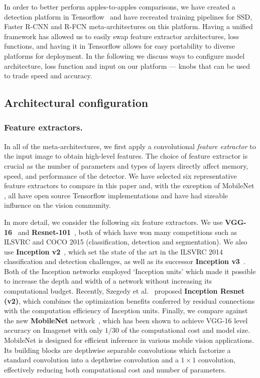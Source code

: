 \documentclass[10pt,twocolumn,letterpaper]{article}
\renewcommand{\paragraph}[1]{\subsubsection{#1}}
\begin{document}
In order to better perform apples-to-apples comparisons, we have created a   detection platform in Tensorflow~\cite{abadi2015tensorflow} and have recreated training pipelines for SSD, Faster R-CNN and R-FCN meta-architectures on this platform.  Having a unified framework has allowed us to easily swap feature extractor architectures, loss functions, 
and having it in Tensorflow allows for easy portability to diverse platforms for deployment.  In the following we discuss ways to configure model architecture, loss function and input on our platform --- knobs that can be used to trade speed and accuracy.

\subsection{Architectural configuration}

\paragraph{Feature extractors.}
In all of the meta-architectures, we first apply a convolutional \emph{feature extractor} to the input image to obtain high-level features.  The choice of feature extractor is crucial as the number of parameters and types of layers directly affect memory, speed, and performance of the detector.
We have selected six representative feature extractors to compare in this paper
and, with the exception of MobileNet \cite{howard17}, all have open source  Tensorflow implementations and have had sizeable influence on the vision community. 


In more detail, we consider the following six feature extractors.
We use
{\bf VGG-16}~\cite{simonyan2014very}
and {\bf  Resnet-101}~\cite{he2015deep}, both of
which have won many competitions such as ILSVRC and COCO 2015
(classification, detection and segmentation).
We also use  {\bf Inception v2}~\cite{ioffe2015batch},
which set the state of the art in the ILSVRC 2014 classification and
detection challenges,
as well as its successor {\bf Inception  v3}~\cite{szegedy2015rethinking}.
Both of the Inception networks
employed `Inception units' which made it possible to increase the
depth and width of a network without increasing its computational
budget.  Recently, Szegedy et al.~\cite{szegedy2016inception} proposed
{\bf Inception Resnet (v2)}, which combines the optimization benefits
conferred by residual connections with the computation efficiency of
Inception units.  Finally, we compare against the new {\bf MobileNet}
network~\cite{howard17}, which has been shown to achieve VGG-16 level
accuracy on Imagenet with only $1/30$ of the computational cost
and model size. MobileNet is designed for efficient inference in
various mobile vision applications. Its building blocks are depthwise
separable convolutions which factorize a standard convolution into a
depthwise convolution and a $1 \times 1$ convolution,  
effectively reducing both computational cost and number of
parameters. 
\end{document}
